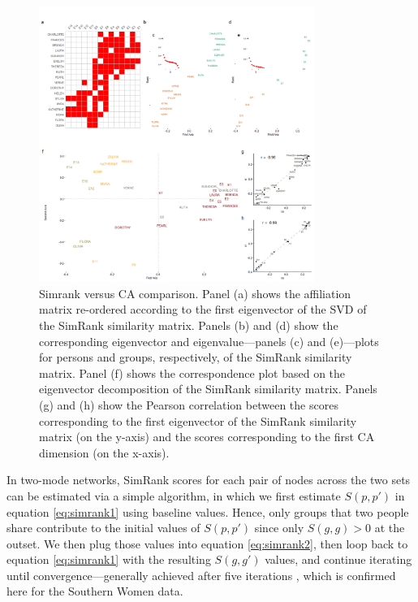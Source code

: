 \documentclass[a4paper,fleqn]{cas-sc}
\begin{document}
\begin{figure}
    \centering
    \includegraphics[width=0.8\textwidth]{Plots/sr-plot.png}
    \caption{Simrank versus CA comparison. Panel (a) shows the affiliation matrix re-ordered according to the first eigenvector of the SVD of the SimRank similarity matrix. Panels (b) and (d) show the corresponding eigenvector and eigenvalue---panels (c) and (e)---plots for persons and groups, respectively, of the SimRank similarity matrix. Panel (f) shows the correspondence plot based on the eigenvector decomposition of the SimRank similarity matrix. Panels (g) and (h) show the Pearson correlation between the scores corresponding to the first eigenvector of the SimRank similarity matrix (on the y-axis) and the scores corresponding to the first CA dimension (on the x-axis).}
    \label{fig:simrank}
\end{figure}

In two-mode networks, SimRank scores for each pair of nodes across the two sets can be estimated via a simple algorithm, in which we first estimate $S(p, p')$ in equation \ref{eq:simrank1} using baseline values. Hence, only groups that two people share contribute to the initial values of $S(p, p')$ since only $S(g, g)>0$ at the outset. We then plug those values into equation \ref{eq:simrank2}, then loop back to equation \ref{eq:simrank1} with the resulting $S(g, g')$ values, and continue iterating until convergence---generally achieved after five iterations \citep{jeh2002simrank}, which is confirmed here for the Southern Women data. 
\end{document}

